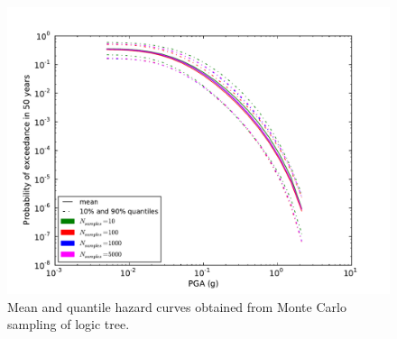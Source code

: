 \begin{figure}
\centering
\includegraphics[width=14cm]{./Pictures/LogicTreeCurves.pdf}
\caption{Mean and quantile hazard curves obtained from Monte Carlo sampling of logic tree.}
\label{fig:logic_tree_curves}
\end{figure}

